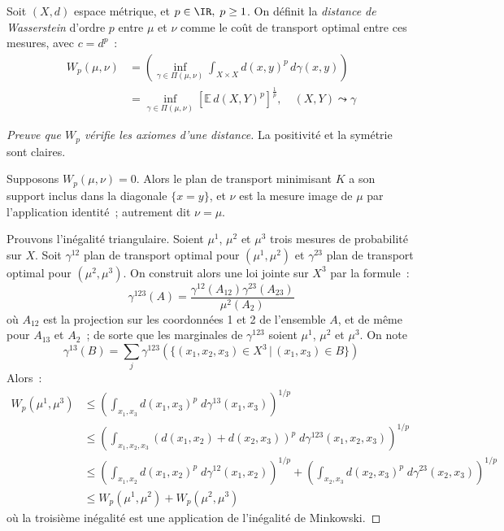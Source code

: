 \begin{definition}
Soit $(X,d)$ espace métrique, et $p \in \IR,\;p \ge 1$. On définit la \emph{distance de Wasserstein} d'ordre $p$ entre $\mu$ et $\nu$ comme le coût de transport optimal entre ces mesures, avec $c = d^p$~:
\begin{equation}
\label{eq:wasserstein}
\begin{split}
W_p(\mu,\nu) & = \left(\inf_{\gamma \in \Pi(\mu,\nu)} \int_{X\times X} d(x,y)^p\,d\gamma(x,y) \right) \\
& = \inf_{\gamma \in \Pi(\mu,\nu)} \left[\mathbb{E}\,d(X,Y)^p \right]^\frac{1}{p}, \quad (X,Y) \leadsto \gamma
\end{split}\end{equation}
\end{definition}

\begin{proof}[Preuve que $W_p$ vérifie les axiomes d'une distance]
La positivité et la symétrie sont claires.

Supposons $W_p(\mu,\nu) = 0$. Alors le plan de transport minimisant $K$ a son support inclus dans la diagonale $\{x=y\}$, et $\nu$ est la mesure image de $\mu$ par l'application identité~; autrement dit $\nu = \mu$.

Prouvons l'inégalité triangulaire. Soient $\mu^1$, $\mu^2$ et $\mu^3$ trois mesures de probabilité sur $X$. Soit $\gamma^{12}$ plan de transport optimal pour $(\mu^1,\mu^2)$ et $\gamma^{23}$ plan de transport optimal pour $(\mu^2,\mu^3)$. On construit alors une loi jointe sur $X^3$ par la formule~:
\[\gamma^{123}(A) = \frac{\gamma^{12}(A_{12}) \gamma^{23}(A_{23})}{\mu^2(A_2)}\]
où $A_{12}$ est la projection sur les coordonnées 1 et 2 de l'ensemble $A$, et de même pour $A_{13}$ et $A_{2}$~;
de sorte que les marginales de $\gamma^{123}$ soient $\mu^1$, $\mu^2$ et $\mu^3$. On note \[\gamma^{13}(B) = \sum_{j} \gamma^{123}(\{(x_1,x_2,x_3) \in X^3 \,|\, (x_1,x_3) \in B\})\] Alors~:
\[\begin{split}
W_p(\mu^1,\mu^3) & \le \left( \int_{x_1,x_3} d(x_1,x_3)^p \;d\gamma^{13}(x_1,x_3) \right)^{1/p} \\
&\le \left( \int_{x_1,x_2,x_3} (d(x_1,x_2) + d(x_2,x_3))^p \;d\gamma^{123}(x_1,x_2,x_3) \right)^{1/p} \\
& \le \left( \int_{x_1,x_2} d(x_1,x_2)^p \;d\gamma^{12}(x_1,x_2) \right)^{1/p} + \left( \int_{x_2,x_3} d(x_2,x_3)^p \;d\gamma^{23}(x_2,x_3) \right)^{1/p} \\
& \le W_p(\mu^1,\mu^2) + W_p(\mu^2,\mu^3)
\end{split}\]
où la troisième inégalité est une application de l'inégalité de Minkowski.
\end{proof}

